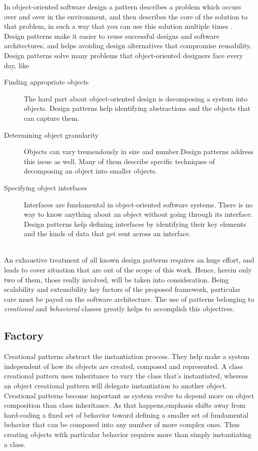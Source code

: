 In object-oriented software design a pattern describes a problem which occurs over and over in the environment, and then describes the core of the solution to that problem, in such a way that you can use this solution multiple times \citep{vlissides1995design}. Design patterns make it easier to reuse successful designs and software architectures, and helps avoiding design alternatives that compromise reusability.
\noindent
\\
Design patterns solve many problems that object-oriented designers face every day, like
\begin{description}
\item[Finding appropriate objects] The hard part about object-oriented design is decomposing a system into objects. Design patterns help identifying abstractions and the objects that can capture them.
\item[Determining object granularity] Objects can vary tremendously in size and number.Design patterns address this issue as well. Many of them describe specific techniques of decomposing an object into smaller objects.
\item[Specifying object interfaces] Interfaces are fundamental in object-oriented software systems. There is no way to know anything about an object without going through its interface. Design patterns help defining interfaces by identifying their key elements and the kinds of data that get sent across an interface.
\end{description}
\noindent
\\
An exhaustive treatment of all known design patterns requires an huge effort, and leads to cover situation that are out of the scope of this work. Hence, herein only two of them, those really involved, will be taken into consideration. Being scalability and extensibility key factors of the proposed framework, particular care must be payed on the software architecture. The use of patterns belonging to \textit{creational} and \textit{behavioral} classes greatly helps to accomplish this objectives. 

\subsection{Factory}

Creational patterns abstract the instantiation process. They help make a system independent of how its objects are created, composed and represented. A class creational pattern uses inheritance to vary the class that's instantiated, whereas an object creational pattern will delegate instantiation to another object. Creational patterns become important as system evolve to depend more on object composition than class inheritance. As that happens,emphasis shifts away from hard-coding a fixed set of behavior toward defining a smaller set of fundamental behavior that can be composed into any number of more complex ones. Thus creating objects with particular behavior requires more than simply instantiating a class.
